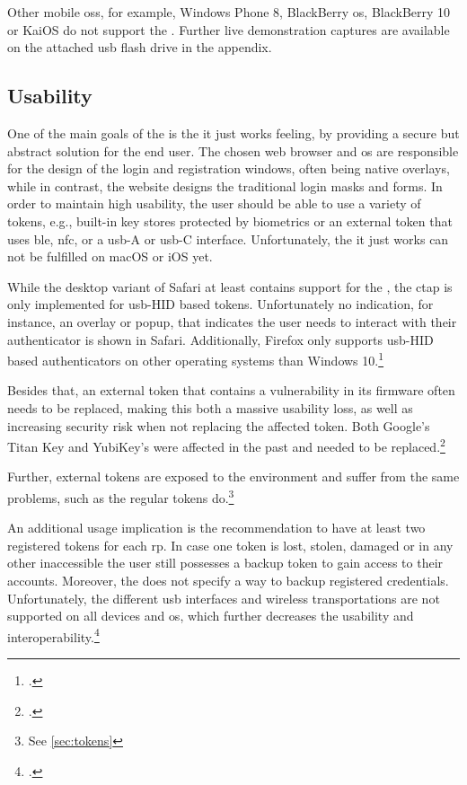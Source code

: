 Other mobile \glspl{os}, for example, Windows Phone 8, BlackBerry \gls{os}, BlackBerry 10 or KaiOS do not support the \wa. Further live demonstration captures are available on the attached \gls{usb} flash drive in the appendix.

\subsection{Usability}

One of the main goals of the \wa{} is the \frqq it just works\flqq{} feeling, by providing a secure but abstract solution for the end user. The chosen web browser and \gls{os} are responsible for the design of the login and registration windows, often being native overlays, while in contrast, the website designs the traditional login masks and forms. In order to maintain high usability, the user should be able to use a variety of tokens, e.g., built-in key stores protected by biometrics or an external token that uses \gls{ble}, \gls{nfc}, or a \gls{usb}-A or \gls{usb}-C interface. Unfortunately, the \frqq it just works\flqq{} can not be fulfilled on macOS or iOS yet.

While the desktop variant of Safari at least contains support for the \wa, the \gls{ctap} is only implemented for \gls{usb}-HID based tokens. Unfortunately no indication, for instance, an overlay or popup, that indicates the user needs to interact with their authenticator is shown in Safari. Additionally, Firefox only supports \gls{usb}-HID based authenticators on other operating systems than Windows 10.\footcites[See][]{rust-authenticator}

Besides that, an external token that contains a vulnerability in its firmware often needs to be replaced, making this both a massive usability loss, as well as increasing security risk when not replacing the affected token. Both Google's Titan Key and YubiKey's were affected in the past and needed to be replaced.\footcites[See][]{yubikey-heise}[See][]{titan-key}

Further, external tokens are exposed to the environment and suffer from the same problems, such as the regular tokens do.\footnote{See \autoref{sec:tokens}}

An additional usage implication is the recommendation to have at least two registered tokens for each \gls{rp}. In case one token is lost, stolen, damaged or in any other inaccessible the user still possesses a backup token to gain access to their accounts. Moreover, the \wa{} does not specify a way to backup registered credentials. Unfortunately, the different \gls{usb} interfaces and wireless transportations are not supported on all devices and \gls{os}, which further decreases the usability and interoperability.\footcites[See][Chapter 13.6]{w3c}[See][15]{das2018johnny}

